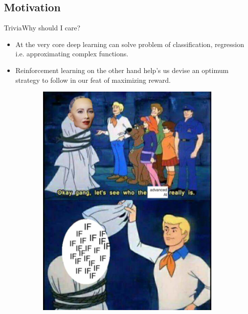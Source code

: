 \documentclass[10pt]{beamer}
\begin{document}
\subsection{Motivation}
\begin{frame}{Trivia}{Why should I care?}
  \begin{itemize}
    \item At the very core deep learning can solve problem of classification, regression i.e. approximating complex functions.
    \item Reinforcement learning on the other hand help's us devise an optimum strategy to follow in our feat of maximizing reward.
  \end{itemize}

\begin{figure}[!htb]
\centering
\begin{subfigure}[t]{0.6\linewidth}
\includegraphics[width=.65\textwidth]{assets/adv_ai_meme.jpg}
\end{subfigure}

\vspace{0.1in}
\label{fig:tripEmb}
\end{figure}

\end{frame}

\end{document}
